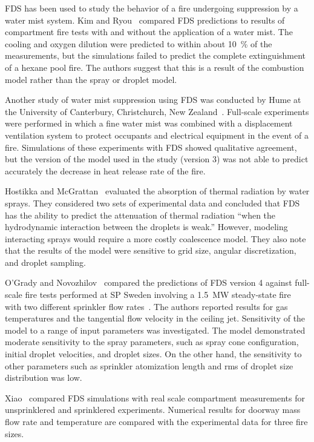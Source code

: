 FDS  has  been  used  to  study  the behavior  of  a  fire  undergoing suppression     by     a    water     mist     system.     Kim     and Ryou~\cite{Kim:BE2003,Kim:IJACR2004}   compared  FDS   predictions  to results of compartment fire tests  with and without the application of a water mist. The cooling and oxygen dilution were predicted to within about 10~\% of the measurements, but the simulations failed to predict the complete extinguishment of a hexane pool fire. The authors suggest that this is a result of the combustion model rather than the spray or droplet model.

Another study  of water  mist suppression using  FDS was  conducted by Hume   at   the    University   of   Canterbury,   Christchurch,   New Zealand~\cite{Hume:Masters}. Full-scale  experiments were performed in which a fine  water mist was combined with  a displacement ventilation system to protect occupants and electrical equipment in the event of a fire.  Simulations of  these experiments  with FDS  showed qualitative agreement, but the version of the  model used in the study (version 3) was not able  to predict accurately the decrease  in heat release rate of the fire.

Hostikka    and   McGrattan~\cite{Hostikka:FSJ2006}    evaluated   the absorption of  thermal radiation by water sprays.  They considered two sets of experimental data and concluded  that FDS has  the ability to predict the  attenuation of thermal radiation  ``when the hydrodynamic interaction between   the  droplets  is   weak.''  However,  modeling interacting sprays would require a more costly coalescence model. They also note that  the results of the model were  sensitive to grid size, angular discretization, and droplet sampling.

O'Grady and Novozhilov~\cite{OGrady:CST} compared the predictions of FDS version 4 against full-scale fire tests performed at SP Sweden involving a 1.5~MW steady-state fire with two different sprinkler flow rates~\cite{Ingason:1}. The authors reported results for gas temperatures and the tangential flow velocity in the ceiling jet. Sensitivity of the model to a range of input parameters was investigated. The model demonstrated moderate sensitivity to the spray parameters, such as spray cone configuration, initial droplet velocities, and droplet sizes. On the other hand, the sensitivity to other parameters such as sprinkler atomization length and rms of droplet size distribution was low.

Xiao~\cite{Xiao:FT2012} compared FDS simulations with real scale compartment measurements for unsprinklered and sprinklered experiments. Numerical results for doorway mass flow rate and temperature are compared with the experimental data for three fire sizes.



